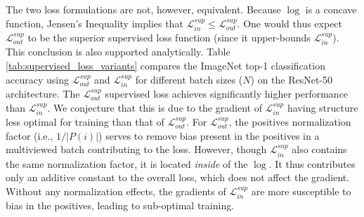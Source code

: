 The two loss formulations are not, however, equivalent.
Because $\log$ is a concave function, Jensen's Inequality \cite{jensen1906sur} implies that $\mathcal{L}_{in}^{sup}\le\mathcal{L}_{out}^{sup}$. One would thus expect $\mathcal{L}_{out}^{sup}$ to be the superior supervised loss function (since it upper-bounds $\mathcal{L}_{in}^{sup}$). This conclusion is also supported analytically.
Table \ref{tab:supervised_loss_variants} compares the ImageNet \cite{deng2009imagenet} top-1 classification accuracy using $\mathcal{L}_{out}^{sup}$ and $\mathcal{L}_{in}^{sup}$ for different batch sizes ($N$) on the ResNet-50 \cite{he2016deep} architecture. The $\mathcal{L}_{out}^{sup}$ supervised loss achieves significantly higher performance than $\mathcal{L}_{in}^{sup}$. We conjecture that this is due to the gradient of $\mathcal{L}_{in}^{sup}$ having structure less optimal for training than that of $\mathcal{L}_{out}^{sup}$. For $\mathcal{L}_{out}^{sup}$, the positives normalization factor (i.e., $1/|P(i)|$) serves to remove bias present in the positives in a multiviewed batch contributing to the loss. However, though $\mathcal{L}_{in}^{sup}$ also contains the same normalization factor, it is located \emph{inside} of the $\log$. It thus contributes only an additive constant to the overall loss, which does not affect the gradient. Without any normalization effects, the gradients of $\mathcal{L}_{in}^{sup}$ are more susceptible to bias in the positives, leading to sub-optimal training.


